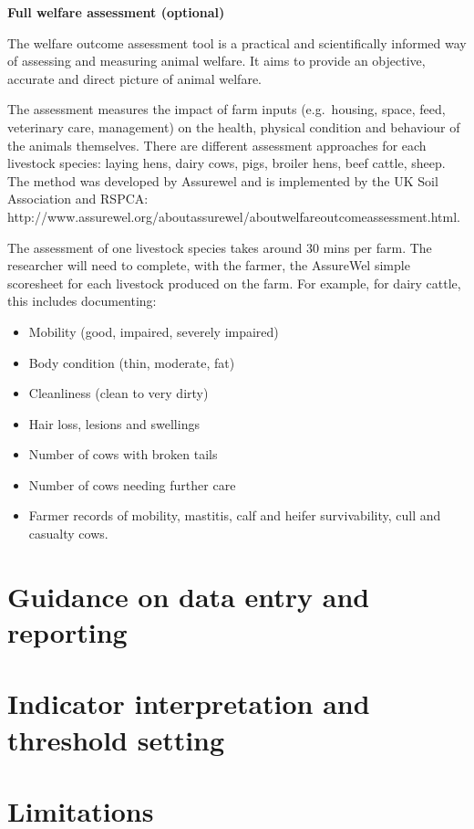 \documentclass[
  letterpaper,
  DIV=11,
  numbers=noendperiod]{scrreprt}
\providecommand{\tightlist}{%
  \setlength{\itemsep}{0pt}\setlength{\parskip}{0pt}}
\begin{document}
\textbf{Full welfare assessment (optional)}

The welfare outcome assessment tool is a practical and scientifically
informed way of assessing and measuring animal welfare. It aims to
provide an objective, accurate and direct picture of animal welfare.

The assessment measures the impact of farm inputs (e.g.~housing, space,
feed, veterinary care, management) on the health, physical condition and
behaviour of the animals themselves. There are different assessment
approaches for each livestock species: laying hens, dairy cows, pigs,
broiler hens, beef cattle, sheep. The method was developed by Assurewel
and is implemented by the UK Soil Association and RSPCA:
http://www.assurewel.org/aboutassurewel/aboutwelfareoutcomeassessment.html.

The assessment of one livestock species takes around 30 mins per farm.
The researcher will need to complete, with the farmer, the AssureWel
simple scoresheet for each livestock produced on the farm. For example,
for dairy cattle, this includes documenting:

\begin{itemize}
\tightlist
\item
  Mobility (good, impaired, severely impaired)
\item
  Body condition (thin, moderate, fat)
\item
  Cleanliness (clean to very dirty)
\item
  Hair loss, lesions and swellings
\item
  Number of cows with broken tails
\item
  Number of cows needing further care
\item
  Farmer records of mobility, mastitis, calf and heifer survivability,
  cull and casualty cows.
\end{itemize}

\section{Guidance on data entry and
reporting}\label{guidance-on-data-entry-and-reporting-1}

\section{Indicator interpretation and threshold
setting}\label{indicator-interpretation-and-threshold-setting-1}

\section{Limitations}\label{limitations-1}
\end{document}
